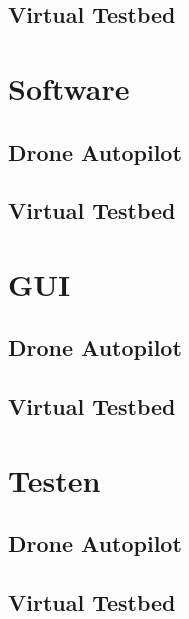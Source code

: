 \documentclass[tt]{penoverslag}
\begin{document}
\subsection{Virtual Testbed}



\section{Software}
\label{sec:Software}



\subsection{Drone Autopilot}



\subsection{Virtual Testbed}



\section{GUI}
\label{sec:GUI}



\subsection{Drone Autopilot}



\subsection{Virtual Testbed}



\section{Testen}
\label{sec:Testen}



\subsection{Drone Autopilot}



\subsection{Virtual Testbed}

\end{document}
